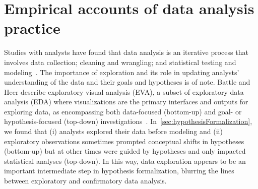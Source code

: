 


\section{Empirical accounts of data analysis practice}
Studies with analysts have found that data analysis is an iterative process that
involves data collection; cleaning and wrangling; and statistical testing and
modeling~\cite{kandel2012enterprise,alspaugh2018futzing,wongsuphasawat2019EDAgoals,grolemund2014cognitive,liu2019paths,liu2019understanding}.
The importance of exploration and its role in updating analysts' understanding
of the data and their goals and hypotheses is of note. Battle and Heer describe
exploratory visual analysis (EVA), a subset of exploratory data analysis (EDA)
where visualizations are the primary interfaces and outputs for exploring data,
as encompassing both data-focused (bottom-up) and goal- or hypothesis-focused
(top-down) investigations~\cite{battle2019EVA}.
In~\autoref{sec:hypothesisFormalization}, we found that (i) analysts explored
their data before modeling and (ii) exploratory observations sometimes prompted
conceptual shifts in hypotheses (bottom-up) but at other times were guided by
hypotheses and only impacted statistical analyses (top-down). In this way, data
exploration appears to be an important intermediate step in hypothesis
formalization, blurring the lines between exploratory and confirmatory data
analysis. 

